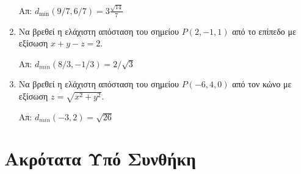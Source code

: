 \begin{enumerate}
    \hfill Απ: $ d_{\min}(9/7,6/7) = 3\frac{\sqrt{14}}{7} $  

  \item Να βρεθεί η ελάχιστη απόσταση του σημείου $ P(2,-1,1) $ από το επίπεδο με 
    εξίσωση $ x+y-z=2 $. 
    
    \hfill Απ: $ d_{min}(8/3,-1/3) = 2 /\sqrt{3} $ 

  \item Να βρεθεί η ελάχιστη απόσταση του σημείου $ P(-6,4,0) $ από τον κώνο με 
    εξίσωση $ z = \sqrt{x^{2}+y^{2}} $. 
    
    \hfill Απ: $ d_{min}(-3,2) = \sqrt{26} $ 

\end{enumerate}


\section*{Ακρότατα Υπό Συνθήκη}

